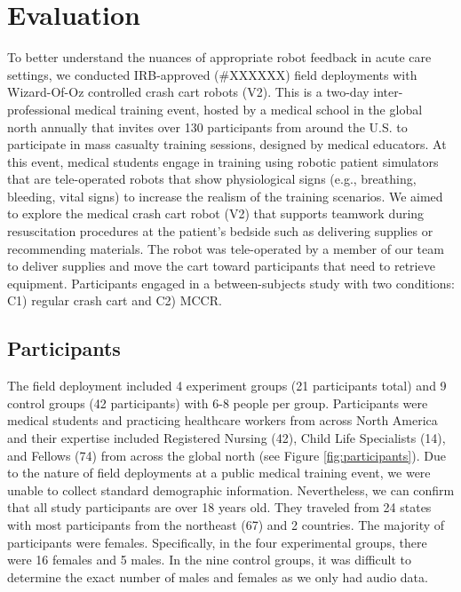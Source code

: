  






\section{Evaluation}

To better understand the nuances of appropriate robot feedback in acute care settings, we conducted IRB-approved (\#XXXXXX) field deployments with Wizard-Of-Oz controlled crash cart robots (V2). 
This is a two-day inter-professional medical training event, hosted by a medical school in the global north annually that invites over 130 participants from around the U.S. to participate in mass casualty training sessions, designed by medical educators. 
At this event, medical students engage in training using robotic patient simulators that are tele-operated robots that show physiological signs (e.g., breathing, bleeding, vital signs) to increase the realism of the training scenarios. 
We aimed to explore the medical crash cart robot (V2) that supports teamwork during resuscitation procedures at the patient’s bedside such as delivering supplies or recommending materials. 
The robot was tele-operated by a member of our team to deliver supplies and move the cart toward participants that need to retrieve equipment. 
Participants engaged in a between-subjects study with two conditions: C1) regular crash cart and C2) MCCR.



\subsection{Participants} 

The field deployment included 4 experiment groups (21 participants total) and 9 control groups (42 participants) with 6-8 people per group.
Participants were medical students and practicing healthcare workers from across North America and their expertise included Registered Nursing (42), Child Life Specialists (14), and Fellows (74) from across the global north (see Figure \ref{fig:participants}).
Due to the nature of field deployments at a public medical training event, we were unable to collect standard demographic information.
Nevertheless, we can confirm that all study participants are over 18 years old.
They traveled from 24 states with most participants from the northeast (67) and 2 countries. 
The majority of participants were females. Specifically, in the four experimental groups, there were 16 females and 5 males. In the nine control groups, it was difficult to determine the exact number of males and females as we only had audio data.




